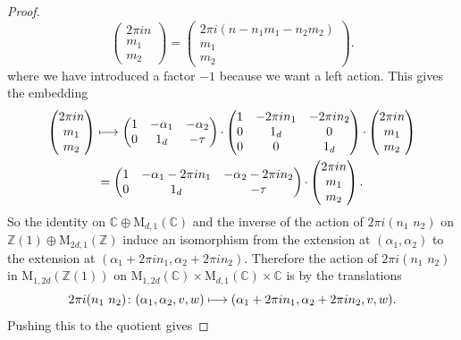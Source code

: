 \documentclass[11pt]{article}
\providecommand{\C}{}
\def\mto{\mathchoice{\longmapsto}{\mapsto}{\mapsto}{\mapsto}}
\theoremstyle{plain}
\theoremstyle{definition}
\numberwithin{equation}{subsection}
\renewcommand{\C}{\mathbb C}
\newcommand{\Z}{\mathbb Z}
\newcommand{\rmM}{\mathrm{M}}
\begin{document}
\begin{proof}
\[\begin{pmatrix}
2\pi in \\ m_1\\ m_2
\end{pmatrix}
 =
\begin{pmatrix}
2\pi i(n - n_1m_1 - n_2m_2) \\ m_1\\ m_2
\end{pmatrix}.
\]
where we have introduced a factor $-1$ because we want a left
action. This gives the embedding
\begin{multline*}
\begin{pmatrix}
2\pi in \\ m_1\\ m_2
\end{pmatrix}
 \mto
\begin{pmatrix}
1 & -\alpha_1 & -\alpha_2\\0 & 1_d & -\tau
\end{pmatrix}{\cdot}
\begin{pmatrix}
1 & -2\pi in_1 & -2\pi i n_2\\
0 & 1_d & 0 \\
0 & 0 & 1_d
\end{pmatrix} {\cdot}
\begin{pmatrix}
2\pi in \\ m_1\\ m_2
\end{pmatrix} \\
 =
\begin{pmatrix}
1 & -\alpha_1-2\pi i n_1 & -\alpha_2-2\pi i n_2\\0 & 1_d & -\tau
\end{pmatrix}{\cdot}
\begin{pmatrix}
2\pi in \\ m_1\\ m_2
\end{pmatrix}.
\end{multline*}
So the identity on $\C\oplus\rmM_{d,1}(\C)$ and the inverse of the
action of $2\pi i(n_1\,\, n_2)$ on $\Z(1)\oplus\rmM_{2d,1}(\Z)$ induce
an isomorphism from the extension at $(\alpha_1,\alpha_2)$ to the
extension at $(\alpha_1+2\pi i n_1, \alpha_2+2\pi i n_2)$.
Therefore the action of $2\pi i(n_1\,\, n_2)$ in $\rmM_{1,2d}(\Z(1))$
on $\rmM_{1,2d}(\C)\times \rmM_{d,1}(\C)\times\C$ is by the translations
\[
2\pi i(n_1\,\, n_2)\colon (\alpha_1,\alpha_2,v,w)\mto
(\alpha_1+2\pi i n_1, \alpha_2+2\pi i n_2, v, w).
\]
Pushing this to the quotient gives

\end{proof}
\end{document}
